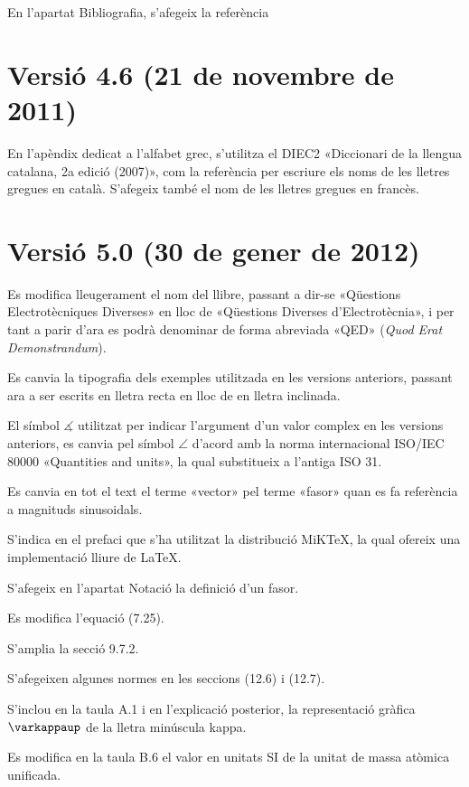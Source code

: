 En l'apartat Bibliografia, s'afegeix la referència \cite{RJB}


\section*{Versió 4.6 (21 de novembre de 2011)}

En l'apèndix dedicat a l'alfabet grec, s'utilitza el DIEC2 «Diccionari de la llengua catalana, 2a edició (2007)», com la referència per escriure els noms de les lletres gregues en català. S'afegeix també el nom de les lletres gregues en francès.


\section*{Versió 5.0 (30 de gener de 2012)}

Es modifica lleugerament el nom del llibre, passant a dir-se «Qüestions Electrotècniques Diverses» en lloc de «Qüestions Diverses d'Electrotècnia», i per tant a parir d'ara es podrà denominar de forma abreviada «QED» (\emph{Quod Erat Demonstrandum}).

Es canvia la tipografia dels exemples utilitzada en les versions anteriors, passant ara a ser escrits en lletra recta en lloc de en lletra inclinada.

El símbol $\measuredangle$ utilitzat per indicar l'argument d'un valor complex en les versions anteriors, es canvia pel símbol $\angle$ d'acord amb la norma internacional ISO/IEC 80000 «Quantities and units», la qual substitueix a l'antiga ISO 31.

Es canvia en tot el text el terme «vector» pel terme «fasor» quan es fa referència a magnituds sinusoidals.

S'indica en el prefaci que s'ha utilitzat la distribució MiK\TeX, la qual ofereix una implementació lliure de \LaTeX.

S'afegeix en l'apartat Notació la definició d'un fasor.

Es modifica l'equació (7.25).

S'amplia la secció 9.7.2.

S'afegeixen algunes normes en les seccions (12.6) i (12.7).

S'inclou en la taula A.1 i en l'explicació posterior, la representació gràfica $\varkappaup$ de la lletra minúscula kappa.

Es modifica en la taula B.6 el valor en unitats SI de la unitat de massa atòmica unificada.

